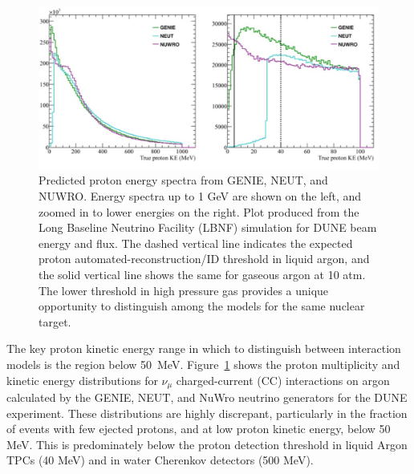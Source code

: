 \begin{figure}%
    \centering
    \includegraphics[width=12cm]{files/Figures/protons_from_argon.jpeg}%
    \caption{Predicted proton energy spectra from GENIE, NEUT, and NUWRO. Energy spectra up to 1 GeV are shown on the left, and zoomed in to lower energies on the right. Plot produced from the Long Baseline Neutrino Facility (LBNF) simulation for DUNE beam energy and flux. The dashed vertical line indicates the expected proton automated-reconstruction/ID threshold in liquid argon, and the solid vertical line shows the same for gaseous argon at 10 atm. The lower threshold in high pressure gas provides a unique opportunity to distinguish among the models for the same nuclear target.}
    \label{fig:protonsfromargon}%
\end{figure}
The key proton kinetic energy range in which to distinguish between interaction models is the region below 50~MeV.
Figure~\ref{fig:protonsfromargon} shows the proton multiplicity and kinetic energy distributions for $\nu_{\mu}$ charged-current (CC) interactions on argon calculated by the GENIE, NEUT, and NuWro neutrino generators for the DUNE experiment.
These distributions are highly discrepant, particularly in the fraction of events with few ejected protons, and at low proton kinetic energy, below 50 MeV.
This is predominately below the proton detection threshold in liquid Argon TPCs (40 MeV) and in water Cherenkov detectors (500 MeV).

